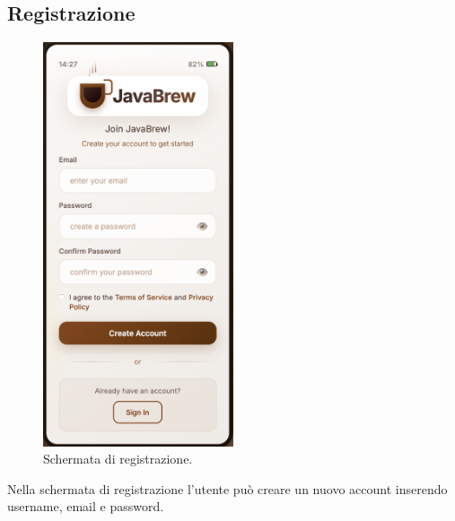 \subsection{Registrazione}
\begin{figure}[H]
    \centering
    \includegraphics[width=0.5\textwidth]{./assets/Create_acoount.png}
    \caption{Schermata di registrazione.}
\end{figure}
Nella schermata di registrazione l’utente può creare un nuovo account inserendo username, email e password.

